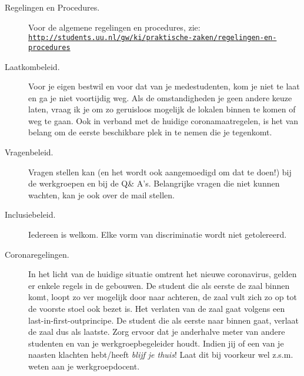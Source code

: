 \documentclass[a4paper,11pt]{article}
\begin{document}
\begin{description}

  \item[Regelingen en Procedures.]
    Voor de algemene regelingen en procedures, zie:
    \href{http://students.uu.nl/gw/ki/praktische-zaken/regelingen-en-procedures}{\texttt{http://students.uu.nl/gw/ki/praktische-zaken/regelingen-en-procedures}}

  \item[Laatkombeleid.]
    Voor je eigen bestwil en voor dat van je medestudenten, kom je niet te laat en ga je niet voortijdig weg.
    Als de omstandigheden je geen andere keuze laten, vraag ik je om zo geruisloos mogelijk de lokalen binnen te komen of weg te gaan.
    Ook in verband met de huidige coronamaatregelen, is het van belang om de eerste beschikbare plek in te nemen die je tegenkomt.


  \item[Vragenbeleid.]
    Vragen stellen kan (en het wordt ook aangemoedigd om dat te doen!) bij de werkgroepen en bij de Q\& A's.
    Belangrijke vragen die niet kunnen wachten, kan je ook over de mail stellen.

  \item[Inclusiebeleid.]
    Iedereen is welkom. Elke vorm van discriminatie wordt niet getolereerd.

  \item[Coronaregelingen.]
    In het licht van de huidige situatie omtrent het nieuwe coronavirus, gelden er enkele regels in de gebouwen.
    De student die als eerste de zaal binnen komt, loopt zo ver mogelijk door naar achteren, de zaal vult zich zo op tot de voorste stoel ook bezet is.
    Het verlaten van de zaal gaat volgens een last-in-first-outprincipe.
    De student die als eerste naar binnen gaat, verlaat de zaal dus als laatste.
    Zorg ervoor dat je anderhalve meter van andere studenten en van je werkgroepbegeleider houdt.
    Indien jij of een van je naasten klachten hebt/heeft \emph{blijf je thuis}! Laat dit bij voorkeur wel z.s.m. weten aan je werkgroepdocent.

\end{description}
    
\end{document}
